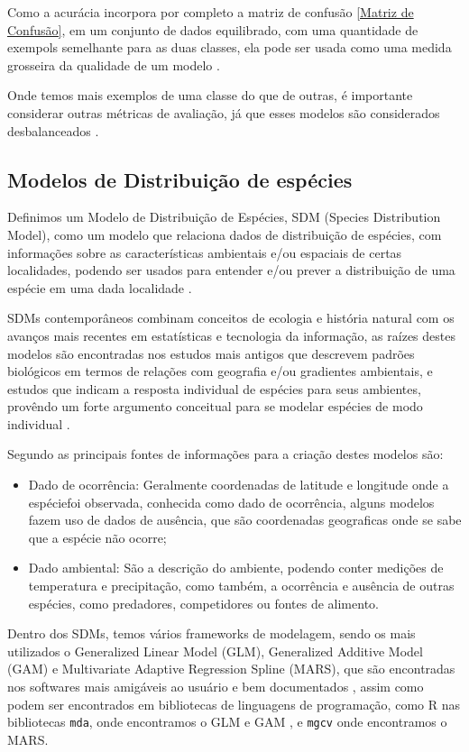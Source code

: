 \documentclass[
	12pt,				%
	openright,			%
	oneside,			%
	a4paper,			%
	english,			%
	brazil				%
	]{abntex2}
\begin{document}
Como a acurácia incorpora por completo a matriz de confusão \ref{Matriz de Confusão}, em um conjunto de dados equilibrado, 
com uma quantidade de exempols semelhante para as duas classes, ela pode ser usada como uma medida grosseira da qualidade 
de um modelo \cite{acuracia_matriz}.

Onde temos mais exemplos de uma classe do que de outras, é importante considerar outras métricas de avaliação, já que esses
modelos são considerados desbalanceados \cite{acuracia}.

\subsection{Modelos de Distribuição de espécies}

Definimos um Modelo de Distribuição de Espécies, SDM (Species Distribution Model), como um modelo que relaciona dados de 
distribuição de espécies, com informações sobre as características ambientais e/ou espaciais de certas localidades, podendo 
ser usados para entender e/ou prever a distribuição de uma espécie em uma dada localidade \cite{speciesDistributionModels}.

SDMs contemporâneos combinam conceitos de ecologia e história natural com os avanços mais recentes em estatísticas e 
tecnologia da informação, as raízes destes modelos são encontradas nos estudos mais antigos que descrevem padrões biológicos 
em termos de relações com geografia e/ou gradientes ambientais, e estudos que indicam a resposta individual de espécies 
para seus ambientes, provêndo um forte argumento conceitual para se modelar espécies de modo individual \cite{speciesDistributionModels}.

Segundo \cite{tiposDados_sdm} as principais fontes de informações para a criação destes modelos são: 
\begin{itemize}
	\item Dado de ocorrência: Geralmente coordenadas de latitude e longitude onde a espéciefoi observada, conhecida como
	dado de ocorrência, alguns modelos fazem uso de dados de ausência, que são coordenadas geograficas 
	onde se sabe que a espécie não ocorre;
	\item Dado ambiental: São a descrição do ambiente, podendo conter medições de temperatura e precipitação, como
	também, a ocorrência e ausência de outras espécies, como predadores, competidores ou fontes de alimento.
\end{itemize}

Dentro dos SDMs, temos vários frameworks de modelagem, sendo os mais utilizados o Generalized Linear Model (GLM), 
Generalized Additive Model (GAM) e Multivariate Adaptive Regression Spline (MARS), que são encontradas nos
softwares mais amigáveis ao usuário e bem documentados \cite{predPerform33models}, assim como podem ser encontrados em 
bibliotecas de linguagens de programação, como R nas bibliotecas \lstinline|mda|, onde encontramos o GLM e GAM \cite{mda},
e \lstinline|mgcv| onde encontramos o MARS\cite{mgcv}.
\end{document}
